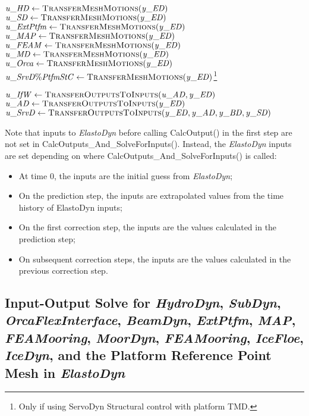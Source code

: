 \documentclass[10pt,letterpaper,oneside,notitlepage]{article}
\begin{document}
\begin{algorithmic}[1]
   \State $\mathit{u\_HD}   \gets \Call{TransferMeshMotions}{\mathit{y\_ED}}$
   \State $\mathit{u\_SD}   \gets \Call{TransferMeshMotions}{\mathit{y\_ED}}$
   \State $\mathit{u\_ExtPtfm}   \gets \Call{TransferMeshMotions}{\mathit{y\_ED}}$
   \State $\mathit{u\_MAP}  \gets \Call{TransferMeshMotions}{\mathit{y\_ED}}$
   \State $\mathit{u\_FEAM} \gets \Call{TransferMeshMotions}{\mathit{y\_ED}}$
   \State $\mathit{u\_MD}   \gets \Call{TransferMeshMotions}{\mathit{y\_ED}}$
   \State $\mathit{u\_Orca} \gets \Call{TransferMeshMotions}{\mathit{y\_ED}}$
   \State $\mathit{u\_SrvD\%PtfmStC} \gets \Call{TransferMeshMotions}{\mathit{y\_ED}}$\footnote{Only if using ServoDyn Structural control with platform TMD.}

\State
\State {}
\State
   \State $\mathit{u\_IfW}  \gets \Call{TransferOutputsToInputs}{\mathit{u\_AD},\mathit{y\_ED}}$
   \State $\mathit{u\_AD}   \gets \Call{TransferOutputsToInputs}{\mathit{y\_ED}}$
   \State $\mathit{u\_SrvD} \gets \Call{TransferOutputsToInputs}{\mathit{y\_ED},\mathit{y\_AD},\mathit{y\_BD},\mathit{y\_SD}}$

\EndProcedure
\end{algorithmic}

Note that inputs to \emph{ElastoDyn} before calling CalcOutput() in the first step are not set in CalcOutputs\_And\_SolveForInputs(). 
Instead, the \emph{ElastoDyn} inputs are set depending on where CalcOutputs\_And\_SolveForInputs() is called:
\begin{itemize}[noitemsep] %
   \item At time 0, the inputs are the initial guess from \emph{ElastoDyn};
   \item On the prediction step, the inputs are extrapolated values from the time history of ElastoDyn inputs;
   \item On the first correction step, the inputs are the values calculated in the prediction step;
   \item On subsequent correction steps, the inputs are the values calculated in the previous correction step.
\end{itemize}


\subsection {Input-Output Solve for \textit{HydroDyn}, \textit{SubDyn}, \textit{OrcaFlexInterface}, \textit{BeamDyn}, \textit{ExtPtfm},  \textit{MAP}, \textit{FEAMooring}, \textit{MoorDyn},  
       \textit{FEAMooring}, \textit{IceFloe}, \textit{IceDyn}, and the Platform Reference Point Mesh in \textit{ElastoDyn}}
\end{document}

